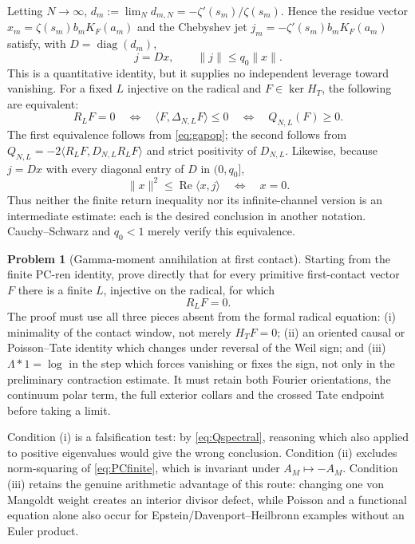 \documentclass[11pt]{amsart}
\theoremstyle{definition}
\newtheorem{problem}[theorem]{Problem}
\theoremstyle{remark}
\newcommand{\Rel}{\operatorname{Re}}
\begin{document}
Letting $N\to\infty$, $d_m:=\lim_Nd_{m,N}=-\zeta'(s_m)/\zeta(s_m)$. Hence the residue vector
$x_m=\zeta(s_m)b_mK_F(a_m)$ and the Chebyshev jet $j_m=-\zeta'(s_m)b_mK_F(a_m)$ satisfy, with
$D=\operatorname{diag}(d_m)$,
\begin{equation}\label{eq:smallgain}
 j=D x,\qquad \|j\|\le q_0\|x\|.
\end{equation}
This is a quantitative identity, but it supplies no independent leverage toward vanishing.  For a
fixed $L$ injective on the radical and $F\in\ker H_T$, the following are equivalent:
\begin{equation}\label{eq:equivgate}
 R_LF=0
 \quad\Longleftrightarrow\quad
 \langle F,\Delta_{N,L}F\rangle\le0
 \quad\Longleftrightarrow\quad
 Q_{N,L}(F)\ge0.
\end{equation}
The first equivalence follows from \eqref{eq:gapop}; the second follows from
$Q_{N,L}=-2\langle R_LF,D_{N,L}R_LF\rangle$ and strict positivity of $D_{N,L}$.
Likewise, because $j=Dx$ with every diagonal entry of $D$ in $(0,q_0]$,
\[
 \|x\|^2\le\Rel\langle x,j\rangle\quad\Longleftrightarrow\quad x=0.
\]
Thus neither the finite return inequality nor its infinite-channel version is an intermediate
estimate: each is the desired conclusion in another notation.  Cauchy--Schwarz and $q_0<1$ merely
verify this equivalence.

\begin{problem}[Gamma-moment annihilation at first contact]\label{prob:annihilate}
Starting from the finite PC-ren identity, prove directly that for every primitive first-contact
vector $F$ there is a finite $L$, injective on the radical, for which
\begin{equation}\label{eq:annihilate}
 R_LF=0.
\end{equation}
The proof must use all three pieces absent from the formal radical equation: (i) minimality of the
contact window, not merely $H_TF=0$; (ii) an oriented causal or Poisson--Tate identity which changes
under reversal of the Weil sign; and (iii) $\Lambda*1=\log$ in the step which forces vanishing or
fixes the sign, not only in the preliminary contraction estimate.  It must retain both Fourier
orientations, the continuum polar term, the full exterior collars and the crossed Tate endpoint
before taking a limit.
\end{problem}

Condition (i) is a falsification test: by \eqref{eq:Qspectral}, reasoning which also applied to
positive eigenvalues would give the wrong conclusion.  Condition (ii) excludes norm-squaring of
\eqref{eq:PCfinite}, which is invariant under $A_M\mapsto-A_M$.  Condition (iii) retains the genuine
arithmetic advantage of this route: changing one von Mangoldt weight creates an interior divisor
defect, while Poisson and a functional equation alone also occur for Epstein/Davenport--Heilbronn
examples without an Euler product.
\end{document}
